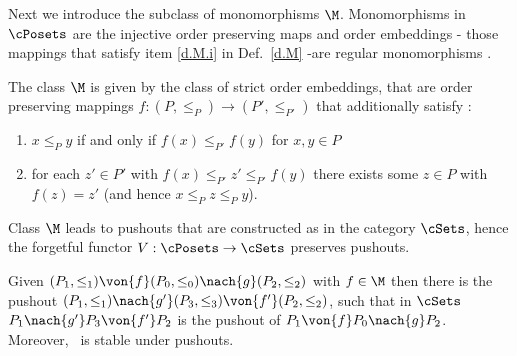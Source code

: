 Next we introduce the subclass of monomorphisms $\M$. Monomorphisms in $\cPosets$ are the injective order preserving  maps \cite{Cod07} and order embeddings - those mappings that satisfy item \ref{d.M.i} in Def.~\ref{d.M} -are regular monomorphisms \cite{Cod07}.


\begin{definition}[Class $\M$]
\label{d.M}
The class $\M$ is given by the class of strict order embeddings,  that are order preserving mappings
$f:(P,\le_P) \to (P',\le_{P'})$ that additionally satisfy :

\begin{enumerate}
	\item \label{d.M.i} $x\le_P y$ if and only if $f(x) \le_{P'} f(y)$ for $x,y  \in P$ 
	\item \label{d.M.ii} for each $  z' \in P'$ with $f(x) \le_{P'} z'  \le_{P'} f(y)$  there exists some $z \in P$ with $f(z) = z'$ (and hence $x \le_P z \le_P y$).
\end{enumerate}
\end{definition}

Class $\M$ leads to pushouts that are constructed as in the category $\cSets$, hence the forgetful functor
$V:\cPosets\to \cSets$ preserves pushouts.


\begin{lemma}
Given $(P_1,\le_1) \von{f} (P_0,\le_0) \nach{g} (P_2,\le_2)$  with $f\in \M$ then there is the pushout
	     $(P_1,\le_1) \nach{g'} (P_3,\le_3) \von{f'} (P_2,\le_2)$,
			   such that in $\cSets$ $P_1 \nach{g'} P_3 \von{f'} P_2$  is the pushout of 
					        $P_1\von{f} P_0 \nach{g} P_2$.\\
				Moreover,  \M \ is stable under pushouts.
\end{lemma}


